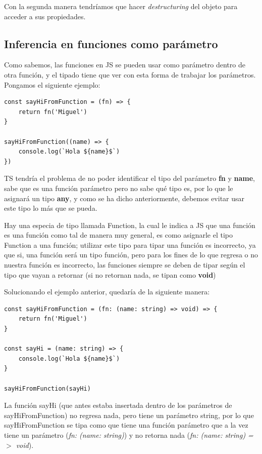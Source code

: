 Con la segunda manera tendríamos que hacer \textit{destructuring} del objeto para acceder a sus propiedades.


\subsection{Inferencia en funciones como parámetro}

Como sabemos, las funciones en JS se pueden usar como parámetro dentro de otra función, y el tipado tiene que ver con esta forma de trabajar los parámetros. Pongamos el siguiente ejemplo:
\begin{lstlisting}
const sayHiFromFunction = (fn) => {
    return fn('Miguel')
}

sayHiFromFunction((name) => {
    console.log(`Hola ${name}$`)
})
\end{lstlisting}

TS tendría el problema de no poder identificar el tipo del parámetro \textbf{fn} y \textbf{name}, sabe que es una función parámetro pero no sabe qué tipo es, por lo que le asignará un tipo \textbf{any}, y como se ha dicho anteriormente, debemos evitar usar este tipo lo más que se pueda.

Hay una especia de tipo llamada Function, la cual le indica a JS que una función es una función como tal de manera muy general, es como asignarle el tipo Function a una función; utilizar este tipo para tipar una función es incorrecto, ya que si, una función será un tipo función, pero para los fines de lo que regresa o no nuestra función es incorrecto, las funciones siempre se deben de tipar según el tipo que vayan a retornar (si no retornan nada, se tipan como \textbf{void})

Solucionando el ejemplo anterior, quedaría de la siguiente manera:
\begin{lstlisting}
const sayHiFromFunction = (fn: (name: string) => void) => {
    return fn('Miguel')
}

const sayHi = (name: string) => {
    console.log(`Hola ${name}$`)
}

sayHiFromFunction(sayHi)
\end{lstlisting}

La función sayHi (que antes estaba insertada dentro de los parámetros de sayHiFromFunction) no regresa nada, pero tiene un parámetro string, por lo que sayHiFromFunction se tipa como que tiene una función parámetro que a la vez tiene un parámetro (\textit{fn: (name: string)}) y no retorna nada (\textit{fn: (name: string) =$>$ void}).


